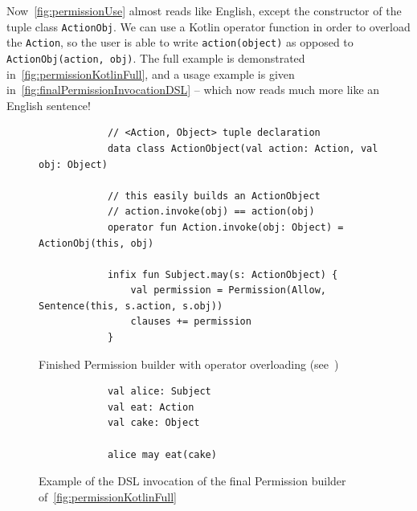 Now~\autoref{fig:permissionUse} almost reads like English, except the constructor of the tuple class \texttt{ActionObj}.
We can use a Kotlin operator function in order to overload the \texttt{Action}, so the user is able to write \texttt{action(object)} as opposed to \texttt{ActionObj(action, obj)}.
The full example is demonstrated in~\autoref{fig:permissionKotlinFull}, and a usage example is given in~\autoref{fig:finalPermissionInvocationDSL} -- which now reads much more like an English sentence!


\begin{figure}[h]
    \centering
    \begin{minipage}{\textwidth}
        \begin{verbatim}
            // <Action, Object> tuple declaration
            data class ActionObject(val action: Action, val obj: Object)

            // this easily builds an ActionObject
            // action.invoke(obj) == action(obj)
            operator fun Action.invoke(obj: Object) = ActionObj(this, obj)

            infix fun Subject.may(s: ActionObject) {
                val permission = Permission(Allow, Sentence(this, s.action, s.obj))
                clauses += permission
            }
        \end{verbatim}
    \end{minipage}
    \caption[Finished Permission builder]{Finished Permission builder with operator overloading (see~\cite{kotlinInvokeOperator})}
    \label{fig:permissionKotlinFull}
\end{figure}



\begin{figure}[h]
    \centering
    \begin{minipage}{0.5\textwidth}
        \begin{verbatim}
            val alice: Subject
            val eat: Action
            val cake: Object

            alice may eat(cake)
        \end{verbatim}
    \end{minipage}
    \caption{Example of the DSL invocation of the final Permission builder of~\autoref{fig:permissionKotlinFull}}
    \label{fig:finalPermissionInvocationDSL}
\end{figure}

